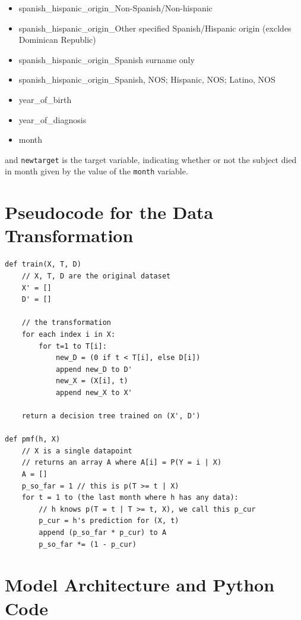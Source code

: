 \documentclass[a4paper,11pt]{article}
\newcommand{\codewhite}[1]{\colorbox{white}{\texttt{#1}}}
\begin{document}
\begin{itemize}[noitemsep]
\item spanish\_hispanic\_origin\_Non-Spanish/Non-hispanic
\item spanish\_hispanic\_origin\_Other specified Spanish/Hispanic origin (excldes Dominican Republic)
\item spanish\_hispanic\_origin\_Spanish surname only
\item spanish\_hispanic\_origin\_Spanish, NOS; Hispanic, NOS; Latino, NOS
\item year\_of\_birth
\item year\_of\_diagnosis
\item month
\end{itemize}

and 
\codewhite{newtarget} is the target variable, indicating whether or not the subject died in month given by the value of the \codewhite{month} variable.


\section{Pseudocode for the Data Transformation}
\label{subsec:pseudocode}

\begin{verbatim}
def train(X, T, D)
    // X, T, D are the original dataset
    X' = []
    D' = []

    // the transformation
    for each index i in X:
        for t=1 to T[i]:
            new_D = (0 if t < T[i], else D[i])
            append new_D to D'
            new_X = (X[i], t)
            append new_X to X'

    return a decision tree trained on (X', D')

def pmf(h, X)
    // X is a single datapoint
    // returns an array A where A[i] = P(Y = i | X)
    A = []
    p_so_far = 1 // this is p(T >= t | X)
    for t = 1 to (the last month where h has any data):
        // h knows p(T = t | T >= t, X), we call this p_cur
        p_cur = h's prediction for (X, t)
        append (p_so_far * p_cur) to A
        p_so_far *= (1 - p_cur)

\end{verbatim}




\section{Model Architecture and Python Code}
\label{sec:architecture}
\end{document}
